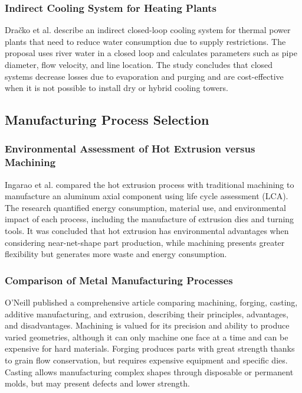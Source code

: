 \documentclass{article}
\begin{document}
\subsubsection*{Indirect Cooling System for Heating Plants}
Dračko et al. \cite{dracko2024cooling} describe an indirect closed-loop cooling system for thermal power plants that need to reduce water consumption due to supply restrictions.
The proposal uses river water in a closed loop and calculates parameters such as pipe diameter, flow velocity, and line location.
The study concludes that closed systems decrease losses due to evaporation and purging and are cost-effective when it is not possible to install dry or hybrid cooling towers.

\subsection*{Manufacturing Process Selection}

\subsubsection*{Environmental Assessment of Hot Extrusion versus Machining}
Ingarao et al. \cite{ingarao2014lca} compared the hot extrusion process with traditional machining to manufacture an aluminum axial component using life cycle assessment (LCA).
The research quantified energy consumption, material use, and environmental impact of each process, including the manufacture of extrusion dies and turning tools.
It was concluded that hot extrusion has environmental advantages when considering near-net-shape part production, while machining presents greater flexibility but generates more waste and energy consumption.

\subsubsection*{Comparison of Metal Manufacturing Processes}
O'Neill \cite{oneill2023metal} published a comprehensive article comparing machining, forging, casting, additive manufacturing, and extrusion, describing their principles, advantages, and disadvantages.
Machining is valued for its precision and ability to produce varied geometries, although it can only machine one face at a time and can be expensive for hard materials.
Forging produces parts with great strength thanks to grain flow conservation, but requires expensive equipment and specific dies.
Casting allows manufacturing complex shapes through disposable or permanent molds, but may present defects and lower strength.
\end{document}
